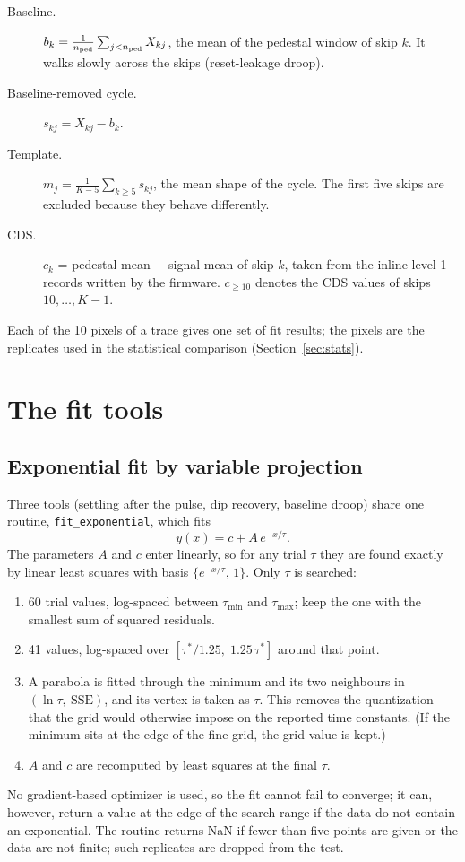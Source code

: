 \documentclass[11pt]{article}
\newcommand{\code}[1]{\texttt{#1}}
\begin{document}
\begin{description}
  \item[Baseline.] $b_k = \frac{1}{n_{\rm ped}}\sum_{j<n_{\rm ped}} X_{kj}$, the mean of the pedestal
        window of skip $k$. It walks slowly across the skips (reset-leakage droop).
  \item[Baseline-removed cycle.] $s_{kj} = X_{kj} - b_k$.
  \item[Template.] $m_j = \frac{1}{K-5}\sum_{k\ge 5} s_{kj}$, the mean shape of the cycle. The first five
        skips are excluded because they behave differently.
  \item[CDS.] $c_k$ = pedestal mean $-$ signal mean of skip $k$, taken from the inline level-1 records
        written by the firmware. $c_{\ge 10}$ denotes the CDS values of skips $10,\dots,K-1$.
\end{description}

Each of the 10 pixels of a trace gives one set of fit results; the pixels are the replicates used in the
statistical comparison (Section~\ref{sec:stats}).

\section{The fit tools}
\label{sec:fits}

\subsection{Exponential fit by variable projection}
\label{sec:exp}

Three tools (settling after the pulse, dip recovery, baseline droop) share one routine,
\code{fit\_exponential}, which fits
\begin{equation}
  y(x) = c + A\,e^{-x/\tau}.
\end{equation}
The parameters $A$ and $c$ enter linearly, so for any trial $\tau$ they are found exactly by linear
least squares with basis $\{e^{-x/\tau},\,1\}$. Only $\tau$ is searched:
\begin{enumerate}
  \item 60 trial values, log-spaced between $\tau_{\min}$ and $\tau_{\max}$; keep the one with the
        smallest sum of squared residuals.
  \item 41 values, log-spaced over $[\tau^*/1.25,\;1.25\,\tau^*]$ around that point.
  \item A parabola is fitted through the minimum and its two neighbours in $(\ln\tau,\ \mathrm{SSE})$,
        and its vertex is taken as $\tau$. This removes the quantization that the grid would otherwise
        impose on the reported time constants. (If the minimum sits at the edge of the fine grid, the grid
        value is kept.)
  \item $A$ and $c$ are recomputed by least squares at the final $\tau$.
\end{enumerate}
No gradient-based optimizer is used, so the fit cannot fail to converge; it can, however, return a value at
the edge of the search range if the data do not contain an exponential. The routine returns NaN if fewer
than five points are given or the data are not finite; such replicates are dropped from the test.
\end{document}
